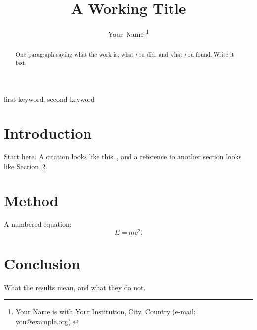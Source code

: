 \documentclass[journal]{IEEEtran}
\begin{document}
\title{A Working Title}

\author{Your~Name%
\thanks{Your Name is with Your Institution, City, Country
(e-mail: you@example.org).}}


\maketitle

\begin{abstract}
One paragraph saying what the work is, what you did, and what you found.
Write it last.
\end{abstract}

\begin{IEEEkeywords}
first keyword, second keyword
\end{IEEEkeywords}

\section{Introduction}
\label{sec:introduction}

Start here.  A citation looks like this~\cite{knuth1984}, and a reference to
another section looks like Section~\ref{sec:method}.

\section{Method}
\label{sec:method}

A numbered equation:
\begin{equation}
  \label{eq:example}
  E = mc^2.
\end{equation}

\section{Conclusion}

What the results mean, and what they do not.



\end{document}
